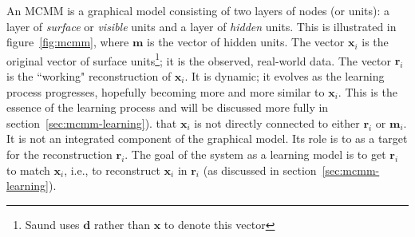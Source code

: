 An MCMM is a graphical model consisting of two layers of nodes (or units): a layer 
of \emph{surface} or \emph{visible} units 
and a layer of \emph{hidden} units. 
This is illustrated in figure~\ref{fig:mcmm}, where $\mathbf{m}$ 
is the vector of hidden units. The vector $\mathbf{x}_i$ is the 
original vector of surface units\footnote{Saund uses $\mathbf{d}$ 
rather than $\mathbf{x}$ to denote this vector}; it is the observed, 
real-world data. The vector $\mathbf{r}_i$ is the ``working" 
reconstruction of $\mathbf{x}_i$. It is dynamic; 
it evolves as the learning process progresses, hopefully 
becoming more and more similar to $\mathbf{x}_i$. 
This is the essence of the learning process and will be 
discussed more fully in section~\ref{sec:mcmm-learning}).
that $\mathbf{x}_i$ is not directly connected to either $\mathbf{r}_i$ 
or $\mathbf{m}_i$. It is not an integrated component of the graphical 
model. Its role is to as a target for the reconstruction $\mathbf{r}_i$. 
The goal of the system as a learning model is to get $\mathbf{r}_i$ to 
match $\mathbf{x}_i$, i.e., to reconstruct $\mathbf{x}_i$ in 
$\mathbf{r}_i$ (as discussed in section~\ref{sec:mcmm-learning}).


